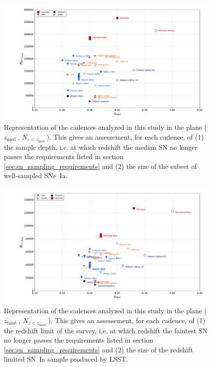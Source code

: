 \documentclass [11pt,a4paper]{article}
\newcommand{\zfaint}{$z_{\mathrm{faint}}\ $}
\newcommand{\nsnfaint}{$N_{z<z_{\mathrm{faint}}}\ $}
\newcommand{\zmed}{$z_{\mathrm{med}}\ $}
\newcommand{\nsnmed}{$N_{z<z_{\mathrm{med}}}\ $}
\begin{document}
\begin{figure}
  \begin{center}
    \includegraphics[width=\linewidth]{Figures/summary_plot_wfd_mediansn.pdf}
    \caption{Representation of the cadences analyzed in this study in
      the plane (\zmed, \nsnmed). This gives an assessement, for each
      cadence, of (1) the sample depth, i.e. at which redshift the
      median SN no longer passes the requirements listed in section
      \ref{sec:sn_sampling_requirements} and (2) the size of the
      subset of well-sampled SNe~Ia.}
    \label{fig:nsn_zmax_med}
  \end{center}
\end{figure}

\begin{figure}
  \begin{center}
    \includegraphics[width=\linewidth]{Figures/summary_plot_wfd_faintsn.pdf}
    \caption{Representation of the cadences analyzed in this study in
      the plane (\zfaint, \nsnfaint). This gives an assessement, for
      each cadence, of (1) the redshift limit of the survey, i.e. at
      which redshift the faintest SN no longer passes the requirements
      listed in section \ref{sec:sn_sampling_requirements} and (2) the
      size of the redshift limited SN~Ia sample produced by LSST.}
    \label{fig:nsn_zmax_faint}
  \end{center}
\end{figure}
\end{document}
